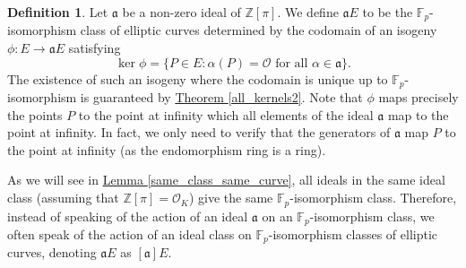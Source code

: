 \documentclass[openany, a4paper, 10pt]{book}
\theoremstyle{plain}
\theoremstyle{plain}
\theoremstyle{plain}
\theoremstyle{definition}
\newtheorem{definition}[theorem]{Definition}
\theoremstyle{plain}
\theoremstyle{definition}
\theoremstyle{remark}
\newcommand{\theoref}[1]{\hyperref[#1]{Theorem \ref{#1}}}
\newcommand{\lemref}[1]{\hyperref[#1]{Lemma \ref{#1}}}
\begin{document}
\begin{definition}\label{action_ideal_curve}
    Let $\mathfrak a$ be a non-zero ideal of $\mathbb Z[\pi]$.
    We define $\mathfrak a E$ to be the $\mathbb F_p$-isomorphism class of elliptic curves determined by the codomain of an isogeny $\phi: E \to \mathfrak aE$ satisfying
    $$\ker \phi = \{ P \in E: \alpha(P) = \mathcal O \text{ for all } \alpha \in \mathfrak a \}.$$
    The existence of such an isogeny where the codomain is unique up to $\mathbb F_p$-isomorphism is guaranteed by \theoref{all_kernels2}.
    Note that $\phi$ maps precisely the points $P$ to the point at infinity which all elements of the ideal $\mathfrak a$ map to the point at infinity.
    In fact, we only need to verify that the generators of $\mathfrak a$ map $P$ to the point at infinity (as the endomorphism ring is a ring).
\end{definition}
As we will see in \lemref{same_class_same_curve}, all ideals in the same ideal class (assuming that $\mathbb Z[\pi] = \mathcal O_K$) give the same $\mathbb F_p$-isomorphism class.
Therefore, instead of speaking of the action of an ideal $\mathfrak a$ on an $\mathbb F_p$-isomorphism class, we often speak of the action of an ideal class on $\mathbb F_p$-isomorphism classes of elliptic curves, denoting $\mathfrak aE$ as $[\mathfrak a]E$.
\end{document}
